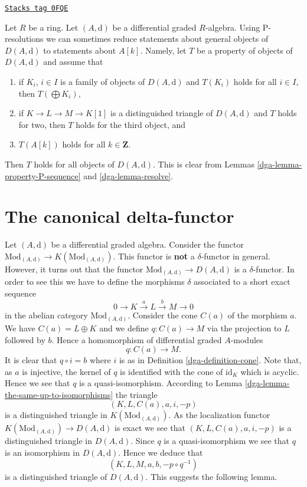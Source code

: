 \begin{remark}[P resolution]
\label{dga-remark-P-resolution}
\href{https://stacks.math.columbia.edu/tag/0FQE}{\texttt{Stacks tag 0FQE}}

Let $R$ be a ring. Let $(A, \text{d})$ be a differential graded $R$-algebra.
Using P-resolutions we can sometimes reduce statements about general
objects of $D(A, \text{d})$ to statements about $A[k]$. Namely, let
$T$ be a property of objects of $D(A, \text{d})$ and assume that
\begin{enumerate}
\item if $K_i$, $i \in I$ is a family of objects of $D(A, \text{d})$
and $T(K_i)$ holds for all $i \in I$, then $T(\bigoplus K_i)$,
\item if $K \to L \to M \to K[1]$ is a distinguished triangle of
$D(A, \text{d})$ and $T$ holds for two, then $T$
holds for the third object, and
\item $T(A[k])$ holds for all $k \in \mathbf{Z}$.
\end{enumerate}
Then $T$ holds for all objects of $D(A, \text{d})$. This is clear from
Lemmas \ref{dga-lemma-property-P-sequence} and \ref{dga-lemma-resolve}.
\end{remark}

\section{The canonical delta-functor}
\label{dga-section-canonical-delta-functor}
Let $(A, \text{d})$ be a differential graded algebra.
Consider the functor
$\text{Mod}_{(A, \text{d})} \to K(\text{Mod}_{(A, \text{d})})$.
This functor is {\bf not} a $\delta$-functor in general.
However, it turns out that the functor
$\text{Mod}_{(A, \text{d})} \to D(A, \text{d})$ is a
$\delta$-functor. In order to see this we have to define
the morphisms $\delta$ associated to a short exact sequence
$$
0 \to K \xrightarrow{a} L \xrightarrow{b} M \to 0
$$
in the abelian category $\text{Mod}_{(A, \text{d})}$.
Consider the cone $C(a)$ of the morphism $a$. We have $C(a) = L \oplus K$
and we define $q : C(a) \to M$ via the projection to $L$ followed
by $b$. Hence a homomorphism of differential graded $A$-modules
$$
q : C(a) \longrightarrow M.
$$
It is clear that $q \circ i = b$ where $i$ is as in
Definition \ref{dga-definition-cone}.
Note that, as $a$ is injective, the kernel of $q$ is identified with the
cone of $\text{id}_K$ which is acyclic. Hence we see that
$q$ is a quasi-isomorphism. According to
Lemma \ref{dga-lemma-the-same-up-to-isomorphisms}
the triangle
$$
(K, L, C(a), a, i, -p)
$$
is a distinguished triangle in $K(\text{Mod}_{(A, \text{d})})$.
As the localization functor
$K(\text{Mod}_{(A, \text{d})}) \to D(A, \text{d})$ is
exact we see that $(K, L, C(a), a, i, -p)$ is a distinguished
triangle in $D(A, \text{d})$. Since $q$ is a quasi-isomorphism
we see that $q$ is an isomorphism in $D(A, \text{d})$.
Hence we deduce that
$$
(K, L, M, a, b, -p \circ q^{-1})
$$
is a distinguished triangle of $D(A, \text{d})$.
This suggests the following lemma.


